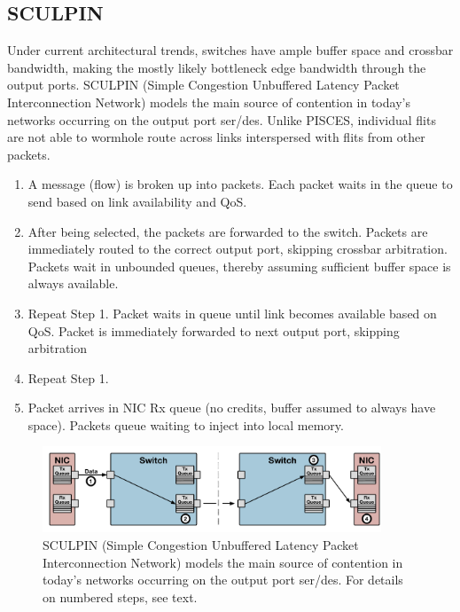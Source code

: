 \subsection{SCULPIN}
Under current architectural trends, switches have ample buffer space and crossbar bandwidth, making the mostly likely bottleneck edge bandwidth through the output ports.
SCULPIN (Simple Congestion Unbuffered Latency Packet Interconnection Network) models the main source of contention in today's networks occurring on the output port ser/des. Unlike PISCES, individual flits are not able to wormhole route across links interspersed with flits from other packets.
\begin{enumerate}
\item A message (flow) is broken up into packets. Each packet waits in the queue to send based on link availability and QoS.
\item After being selected, the packets are forwarded to the switch. Packets are immediately routed to the correct output port, skipping crossbar arbitration. Packets wait in unbounded queues, thereby assuming sufficient buffer space is always available.
\item Repeat Step 1. Packet waits in queue until link becomes available based on QoS. Packet is immediately forwarded to next output port, skipping arbitration
\item Repeat Step 1.
\item Packet arrives in NIC Rx queue (no credits, buffer assumed to always have space). Packets queue waiting to inject into local memory.
\end{enumerate}

\begin{figure}
\centering
\includegraphics[width=0.9\textwidth]{figures/sculpin.pdf}
\caption[SCULPIN model]{SCULPIN (Simple Congestion Unbuffered Latency Packet Interconnection Network) models the main source of contention in today's networks occurring on the output port ser/des. For details on numbered steps, see text.}
\label{fig:sculpin}
\end{figure}

